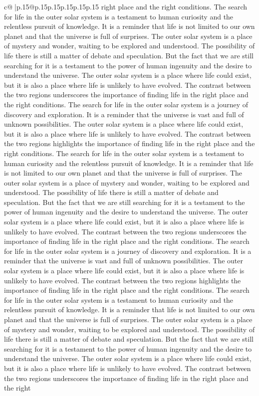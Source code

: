 \documentclass{article}
\begin{document}
{\begin{supertabular}{c@{$\;$}|p{.15\linewidth}@{}p{.15\linewidth}p{.15\linewidth}p{.15\linewidth}p{.15\linewidth}p{.15\linewidth}}
{{{right place and the right conditions. The search for life in the outer solar system is a testament to human curiosity and the relentless pursuit of knowledge. It is a reminder that life is not limited to our own planet and that the universe is full of surprises. The outer solar system is a place of mystery and wonder, waiting to be explored and understood. The possibility of life there is still a matter of debate and speculation. But the fact that we are still searching for it is a testament to the power of human ingenuity and the desire to understand the universe. The outer solar system is a place where life could exist, but it is also a place where life is unlikely to have evolved. The contrast between the two regions underscores the importance of finding life in the right place and the right conditions. The search for life in the outer solar system is a journey of discovery and exploration. It is a reminder that the universe is vast and full of unknown possibilities. The outer solar system is a place where life could exist, but it is also a place where life is unlikely to have evolved. The contrast between the two regions highlights the importance of finding life in the right place and the right conditions. The search for life in the outer solar system is a testament to human curiosity and the relentless pursuit of knowledge. It is a reminder that life is not limited to our own planet and that the universe is full of surprises. The outer solar system is a place of mystery and wonder, waiting to be explored and understood. The possibility of life there is still a matter of debate and speculation. But the fact that we are still searching for it is a testament to the power of human ingenuity and the desire to understand the universe. The outer solar system is a place where life could exist, but it is also a place where life is unlikely to have evolved. The contrast between the two regions underscores the importance of finding life in the right place and the right conditions. The search for life in the outer solar system is a journey of discovery and exploration. It is a reminder that the universe is vast and full of unknown possibilities. The outer solar system is a place where life could exist, but it is also a place where life is unlikely to have evolved. The contrast between the two regions highlights the importance of finding life in the right place and the right conditions. The search for life in the outer solar system is a testament to human curiosity and the relentless pursuit of knowledge. It is a reminder that life is not limited to our own planet and that the universe is full of surprises. The outer solar system is a place of mystery and wonder, waiting to be explored and understood. The possibility of life there is still a matter of debate and speculation. But the fact that we are still searching for it is a testament to the power of human ingenuity and the desire to understand the universe. The outer solar system is a place where life could exist, but it is also a place where life is unlikely to have evolved. The contrast between the two regions underscores the importance of finding life in the right place and the right }}}
\end{supertabular}}
\end{document}
